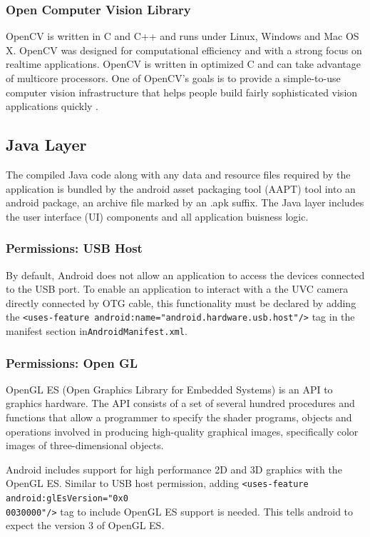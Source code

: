 \subsubsection{Open Computer Vision Library}
OpenCV is written in C and C++ and runs under Linux, Windows and Mac OS X. OpenCV was designed for computational efficiency and with a strong focus on realtime applications. OpenCV is written in optimized C and can take advantage of multicore processors. One of OpenCV’s goals is to provide a simple-to-use computer vision infrastructure that helps people build fairly sophisticated vision applications quickly \parencite{openCv}.



\subsection{Java Layer}


The compiled Java code along with any data and resource files required by the application is bundled by the android asset packaging tool (AAPT) tool into an android package, an archive file marked by an .apk suffix.
The Java layer includes the user interface (UI) components and all application buisness logic.

\subsubsection{Permissions: USB Host}
By default, Android does not allow an application to access the devices connected to the USB  port. To enable an application to interact with a the UVC camera directly connected by OTG cable, this functionality must be declared by adding the \texttt{<uses-feature android:name="android.hardware.usb.host"/>} tag in the manifest section in\texttt{AndroidManifest.xml}. 

\subsubsection{Permissions: Open GL}

OpenGL ES (Open Graphics Library for Embedded Systems) is an API to graphics hardware. The API consists of a set of several hundred procedures and functions that allow a programmer to specify the shader programs, objects and operations involved in producing high-quality graphical images, specifically color images of three-dimensional objects\parencite{openGl}.


Android includes support for high performance 2D and 3D graphics with the OpenGL ES. Similar to USB host permission, adding  \texttt{<uses-feature android:glEsVersion="0x0\\0030000"/>} tag to include OpenGL ES support is needed. This tells android to expect the version 3 of OpenGL ES.








 
